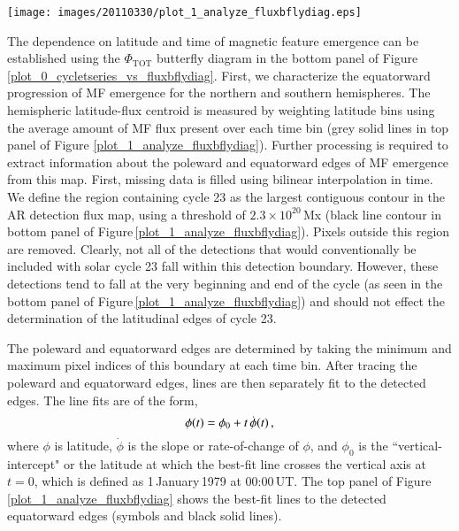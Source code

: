 \documentclass[namedreferences]{solarphysics}
\begin{document}
\begin{article}
\begin{figure*}[!t]
 \texttt{[image: images/20110330/plot\_1\_analyze\_fluxbflydiag.eps]}
\caption{\emph{Top}: Flux-weighted latitude centroid for the north and south hemispheres (thick gray lines), high and low latitude edges (crosses) of detection masks, edges of $10^{22}$\,Mx mask (diamonds), and linear fits to centroids and edges (thin black lines). \emph{Bottom}: Masks of detected centroids for features of greater than $2.3\times10^{20}$\,Mx, $10^{22}$\,Mx, $5\times10^{22}$\,Mx, and $10^{23}$\,Mx denoted in color from white to black, respectively.}\label{plot_1_analyze_fluxbflydiag}
\end{figure*}

The dependence on latitude and time of magnetic feature emergence can be established using the $\Phi_{\mathrm{TOT}}$ butterfly diagram in the bottom panel of Figure \ref{plot_0_cycletseries_vs_fluxbflydiag}. First, we characterize the equatorward progression of MF emergence for the northern and southern hemispheres. The hemispheric latitude-flux centroid is measured by weighting latitude bins using the average amount of MF flux present over each time bin (grey solid lines in top panel of Figure \ref{plot_1_analyze_fluxbflydiag}). 
Further processing is required to extract information about the poleward and equatorward edges of MF emergence from this map. First, missing data is filled using bilinear interpolation in time. We define the region containing cycle 23 as the largest contiguous contour in the AR detection flux map, using a threshold of $2.3\times10^{20}$\,Mx (black line contour in bottom panel of Figure\,\ref{plot_1_analyze_fluxbflydiag}). Pixels outside this region are removed. Clearly, not all of the detections that would conventionally be included with solar cycle 23 fall within this detection boundary. However, these detections tend to fall at the very beginning and end of the cycle (as seen in the bottom panel of Figure\,\ref{plot_1_analyze_fluxbflydiag}) and should not effect the determination of the latitudinal edges of cycle 23.

The poleward and equatorward edges are determined by taking the minimum and maximum pixel indices of this boundary at each time bin. After tracing the poleward and equatorward edges, lines are then separately fit to the detected edges. 
The line fits are of the form,
\begin{equation}
\phi(t)=\phi_{0}+t\,\dot{\phi}(t) \mbox{\,,}
\end{equation}
where $\phi$ is latitude, $\dot{\phi}$ is the slope or rate-of-change of $\phi$, and $\phi_{0}$ is the ``vertical-intercept" or the latitude at which the best-fit line crosses the vertical axis at $t=0$, which is defined as 1\,January\,1979 at 00:00\,UT. %
 The top panel of Figure\,\ref{plot_1_analyze_fluxbflydiag} shows the best-fit lines to the detected equatorward edges (symbols and black solid lines).


\end{article}
\end{document}
